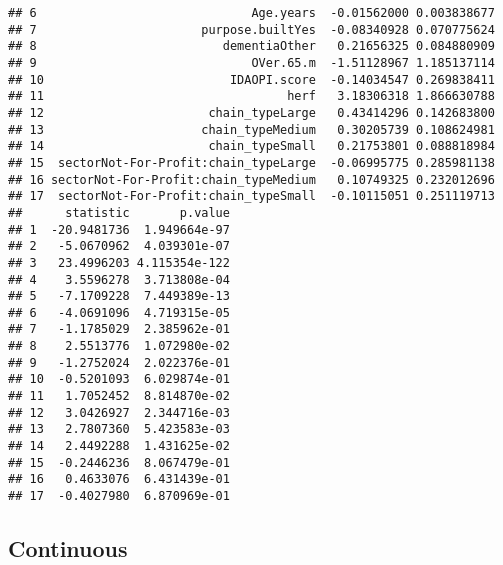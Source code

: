\documentclass[]{article}
\newenvironment{Shaded}{\begin{snugshade}}{\end{snugshade}}
\newcommand{\KeywordTok}[1]{\textcolor[rgb]{0.13,0.29,0.53}{\textbf{{#1}}}}
\newcommand{\DataTypeTok}[1]{\textcolor[rgb]{0.13,0.29,0.53}{{#1}}}
\newcommand{\StringTok}[1]{\textcolor[rgb]{0.31,0.60,0.02}{{#1}}}
\newcommand{\NormalTok}[1]{{#1}}
\begin{document}
\begin{verbatim}
## 6                              Age.years  -0.01562000 0.003838677
## 7                       purpose.builtYes  -0.08340928 0.070775624
## 8                          dementiaOther   0.21656325 0.084880909
## 9                              OVer.65.m  -1.51128967 1.185137114
## 10                          IDAOPI.score  -0.14034547 0.269838411
## 11                                  herf   3.18306318 1.866630788
## 12                       chain_typeLarge   0.43414296 0.142683800
## 13                      chain_typeMedium   0.30205739 0.108624981
## 14                       chain_typeSmall   0.21753801 0.088818984
## 15  sectorNot-For-Profit:chain_typeLarge  -0.06995775 0.285981138
## 16 sectorNot-For-Profit:chain_typeMedium   0.10749325 0.232012696
## 17  sectorNot-For-Profit:chain_typeSmall  -0.10115051 0.251119713
##      statistic       p.value
## 1  -20.9481736  1.949664e-97
## 2   -5.0670962  4.039301e-07
## 3   23.4996203 4.115354e-122
## 4    3.5596278  3.713808e-04
## 5   -7.1709228  7.449389e-13
## 6   -4.0691096  4.719315e-05
## 7   -1.1785029  2.385962e-01
## 8    2.5513776  1.072980e-02
## 9   -1.2752024  2.022376e-01
## 10  -0.5201093  6.029874e-01
## 11   1.7052452  8.814870e-02
## 12   3.0426927  2.344716e-03
## 13   2.7807360  5.423583e-03
## 14   2.4492288  1.431625e-02
## 15  -0.2446236  8.067479e-01
## 16   0.4633076  6.431439e-01
## 17  -0.4027980  6.870969e-01
\end{verbatim}

\subsection{Continuous}\label{continuous-1}

\begin{Shaded}
\end{Shaded}
\end{document}
